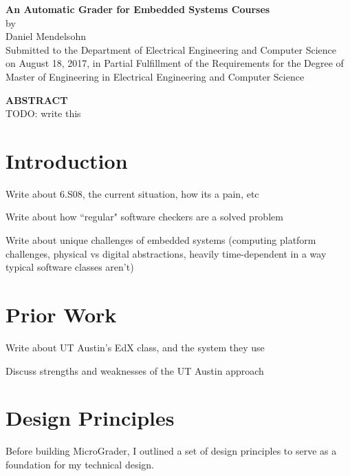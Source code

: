 \documentclass[12pt]{article}
\newcommand{\mytitle}{\textbf{An Automatic Grader for Embedded Systems Courses}}
\newcommand{\mydate}{August 18, 2017}
\begin{document}
\addtocounter{page}{1}

\newpage
\mbox{}
\newpage

\begin{center}
\mytitle \\
by \\
Daniel Mendelsohn \\
\vspace{12pt}
Submitted to the Department of Electrical Engineering and Computer Science\\
 on \mydate{}, in Partial Fulfillment of the Requirements for the Degree of\\
 Master of Engineering in Electrical Engineering and Computer Science
\end{center}
\vspace{12pt}
\textbf{ABSTRACT} \\

\noindent TODO: write this

\newpage
\mbox{}
\newpage

\tableofcontents

\doublespacing

\newpage
\section{Introduction}
Write about 6.S08, the current situation, how its a pain, etc

Write about how ``regular" software checkers are a solved problem

Write about unique challenges of embedded systems (computing platform challenges, physical vs digital abstractions, heavily time-dependent in a way typical software classes aren't)

\newpage
\section{Prior Work}
Write about UT Austin's EdX class, and the system they use

Discuss strengths and weaknesses of the UT Austin approach

\newpage
\section{Design Principles}
Before building MicroGrader, I outlined a set of design principles to serve as a foundation for my technical design.
\end{document}
